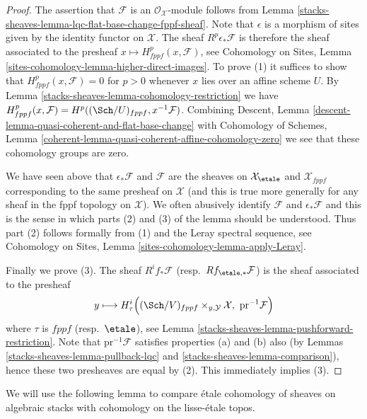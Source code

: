 \begin{proof}
The assertion that $\mathcal{F}$ is an $\mathcal{O}_\mathcal{X}$-module
follows from
Lemma \ref{stacks-sheaves-lemma-lqc-flat-base-change-fppf-sheaf}.
Note that $\epsilon$ is a morphism of sites given by the identity
functor on $\mathcal{X}$. The sheaf $R^p\epsilon_*\mathcal{F}$ is therefore
the sheaf associated to the presheaf
$x \mapsto H^p_{fppf}(x, \mathcal{F})$, see
Cohomology on Sites, Lemma \ref{sites-cohomology-lemma-higher-direct-images}.
To prove (1) it suffices to show that
$H^p_{fppf}(x, \mathcal{F}) = 0$ for $p > 0$
whenever $x$ lies over an affine scheme $U$. By
Lemma \ref{stacks-sheaves-lemma-cohomology-restriction}
we have
$H^p_{fppf}(x, \mathcal{F}) = H^p((\Sch/U)_{fppf}, x^{-1}\mathcal{F})$.
Combining
Descent, Lemma \ref{descent-lemma-quasi-coherent-and-flat-base-change}
with Cohomology of Schemes, Lemma
\ref{coherent-lemma-quasi-coherent-affine-cohomology-zero}
we see that these cohomology groups are zero.

\medskip\noindent
We have seen above that $\epsilon_*\mathcal{F}$ and $\mathcal{F}$ are the
sheaves on $\mathcal{X}_\etale$ and $\mathcal{X}_{fppf}$
corresponding to the same presheaf on $\mathcal{X}$ (and this is true more
generally for any sheaf in the fppf topology on $\mathcal{X}$).
We often abusively identify $\mathcal{F}$ and $\epsilon_*\mathcal{F}$
and this is the sense in which parts (2) and (3) of the lemma should be
understood. Thus part (2) follows formally from (1) and the Leray spectral
sequence, see
Cohomology on Sites, Lemma \ref{sites-cohomology-lemma-apply-Leray}.

\medskip\noindent
Finally we prove (3). The sheaf $R^if_*\mathcal{F}$
(resp.\ $Rf_{\etale, *}\mathcal{F}$)
is the sheaf associated to the presheaf
$$
y \longmapsto
H^i_\tau\Big((\Sch/V)_{fppf} \times_{y, \mathcal{Y}} \mathcal{X},
\ \text{pr}^{-1}\mathcal{F}\Big)
$$
where $\tau$ is $fppf$ (resp.\ $\etale$), see
Lemma \ref{stacks-sheaves-lemma-pushforward-restriction}.
Note that $\text{pr}^{-1}\mathcal{F}$ satisfies properties (a) and (b)
also (by Lemmas \ref{stacks-sheaves-lemma-pullback-lqc} and \ref{stacks-sheaves-lemma-comparison}),
hence these two presheaves are equal by (2).
This immediately implies (3).
\end{proof}

We will use the following lemma to compare \'etale cohomology of sheaves
on algebraic stacks with cohomology on the lisse-\'etale topos.

